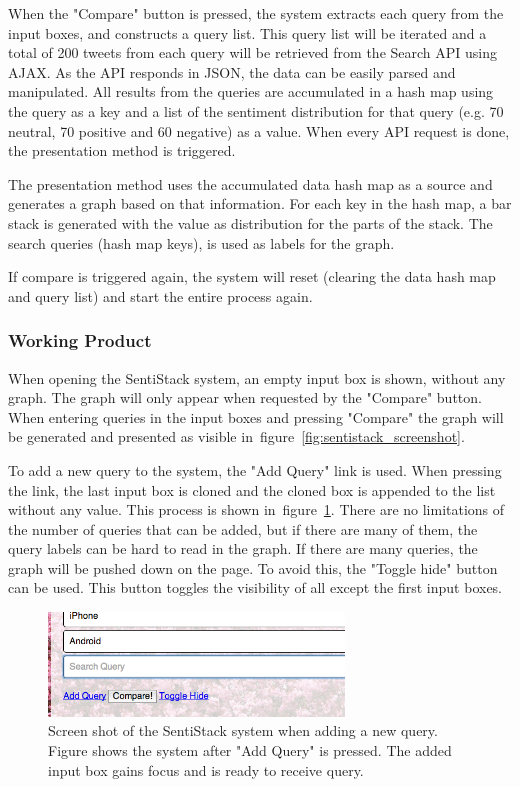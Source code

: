 When the "Compare" button is pressed, the system extracts each query from the input boxes, and constructs a query list. This query list will be iterated and a total of 200 tweets from each query will be retrieved from the Search API using AJAX. As the API responds in JSON, the data can be easily parsed and manipulated. All results from the queries are accumulated in a hash map using the query as a key and a list of the sentiment distribution for that query (e.g. 70 neutral, 70 positive and 60 negative) as a value. When every API request is done, the presentation method is triggered.

The presentation method uses the accumulated data hash map as a source and generates a graph based on that information. For each key in the hash map, a bar stack is generated with the value as distribution for the parts of the stack. The search queries (hash map keys), is used as labels for the graph.

If compare is triggered again, the system will reset (clearing the data hash map and query list) and start the entire process again.

\subsubsection{Working Product}

When opening the SentiStack system, an empty input box is shown, without any graph. The graph will only appear when requested by the "Compare" button. When entering queries in the input boxes and pressing "Compare" the graph will be generated and presented as visible in~figure~\ref{fig:sentistack_screenshot}. 

To add a new query to the system, the "Add Query" link is used. When pressing the link, the last input box is cloned and the cloned box is appended to the list without any value. This process is shown in~figure~\ref{fig:sentistack_addquery}. There are no limitations of the number of queries that can be added, but if there are many of them, the query labels can be hard to read in the graph. If there are many queries, the graph will be pushed down on the page. To avoid this, the "Toggle hide" button can be used. This button toggles the visibility of all except the first input boxes. 

\begin{figure}[htb!]
\begin{center}
 \includegraphics[width=0.7\textwidth]{../img/sentistack_addquery.png}
 \caption[SentiStack add new query screen shot]{Screen shot of the SentiStack system when adding a new query. Figure shows the system after "Add Query" is pressed. The added input box gains focus and is ready to receive query.}
 \label{fig:sentistack_addquery}
\end{center}
\end{figure}


